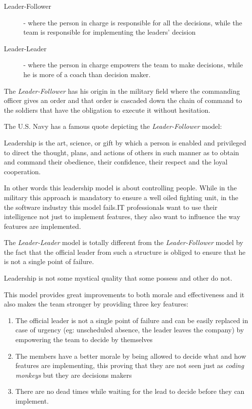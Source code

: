 \begin{description}
\item [Leader-Follower] - where the person in charge is responsible for all the decisions, while the team is responsible for implementing the leaders' decision
\item [Leader-Leader] - where the person in charge empowers the team to make decisions, while he is more of a coach than decision maker.
\end{description}

The \textit{Leader-Follower} has his origin in the military field where the commanding officer gives an order and that order is cascaded down the chain of command to the soldiers that have the obligation to execute it without hesitation. 

The U.S. Navy has a famous quote depicting the \textit{Leader-Follower} model:

\begin{displayquote}
Leadership is the art, science, or gift by which a person is enabled and privileged to direct the thought, plans, and actions of others in such manner as to obtain and command their obedience, their confidence, their respect and the loyal cooperation. \cite{fundamentals-of-naval-leadership}
\end{displayquote}

In other words this leadership model is about controlling people. While in the military this approach is mandatory to ensure a well oiled fighting unit, in the the software industry this model fails.IT professionals want to use their intelligence not just to implement features, they also want to influence the way features are implemented.

The \textit{Leader-Leader} model is totally different from the \textit{Leader-Follower} model by the fact that the official leader from such a structure is obliged to ensure that he is not a single point of failure.

Leadership is not some mystical quality that some possess and other do not.\cite{turn-that-ship-around}

This model provides great improvements to both morale and effectiveness and it also makes the team stronger by providing three key features:
\begin{enumerate}
\item The official leader is not a single point of failure and can be easily replaced in case of urgency (eg: unscheduled absence, the leader leaves the company) by empowering the team to decide by themselves
\item The members have a better morale by being allowed to decide what and how features are implementing, this proving that they are not seen just as \textit{coding monkeys} but they are decisions makers
\item There are no dead times while waiting for the lead to decide before they can implement.
\end{enumerate}

